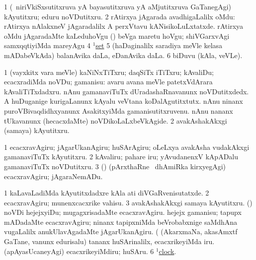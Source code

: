 \noindent 
\gl{\pagu}
\expl{}
\bmng
\bnum
\num{1}  (\sA\ niriVkiSxsutitxruva yA bayasutitxruva yA aMjutitxruva GaTanegAgi) kAyutitxru; eduru noVDutitxru. 
\num{2}  rAtirxya jAgarada avadhigaLalilx oMdu:  rAtirxya nAlakxneV jAgaradalilx A perxVtavu kANisikoLuLxtatxde. 
  
\banum
{} rAtirxya oMdu jAgaradaMte kaLeduhoVgu 
 (\rUpa) beVga maretu hoVgu; shiVGarxvAgi samxqqtiyiMda mareyAgu 
\eanum
\numie
\num{4} \hyperref{kandict_s.pdf}{S}{set(1) pagu(10)}{$^1$set}  
\num{5}  (haDaginalilx saradiya meVle kelasa mADabeVkAda) balanAvika daLa, eDanAvika daLa. 
\num{6}  biDuvu (kAla, veVLe). 
\enum
\emng
\eentry

\bentry
{} 
\gl{\sakirx}
\expl{}
\bmng
\bnum
\num{1} (vayxkitx \mo vara meVle) kaNiNxTiTxru; daqSiTx iTiTxru; kAvaliDu; ecacxradiMda noVDu; gamanisu:  avaru avana meVle patetxVdArara kAvaliTiTxdadxru.  nAnu gamanaviTuTx dUradashaRnavanunx noVDutitxdedx.  A huDuganige kurigaLanunx kAyalu veVtana koDalAgutitxtutx.  nAnu ninanx puroVBivaqdidhxyanunx AsakitxyiMda gamanisutitxruvenu.  nAnu nananx tUkavanunx (hecacxdaMte) noVDikoLaLxbeVkAgide. 
\num{2} avakAshakAkxgi (samaya) kAyutitxru. 
\enum
\emng

\noindent 
\gl{\akirx}
\expl{}
\bmng
\bnum
\num{1} ecacxravAgiru; jAgarUkanAgiru; huSArAgiru; oLeLxya avakAsha \mo vudakAkxgi gamanaviTuTx kAyutitxru. 
\num{2} kAvaliru; pahare iru; yAvudanenxV kApADalu gamanaviTuTx noVDutitxru. 
\num{3} (\pArxparx) (pArxthaRne \mo\ dhAmiRka kirxyegAgi) ecacxravAgiru; jAgaraNemADu. 
\enum
\emng

\noindent 
\gl{\pagu}
\expl{}
\bmng
\bnum
\num{1}  kaLavaLadiMda kAyutitxdadxre kAla ati diVGaRvenisutatxde. 
\num{2}  ecacxravAgiru; munenxcacxrike vahisu. 
\num{3}  avakAshakAkxgi samaya kAyutitxru. \eng{} 
  (\AmA) 
\banum
{} noVDi hejejxyiDu; mugagxrisadaMte ecacxravAgiru. 
 hejejx gamanisu; tapupx mADadaMte ecacxravAgiru; ninanx tapipxniMda beVrobabxnige saMdhAna \mo vugaLalilx anukUlavAgadaMte jAgarUkanAgiru. 
\eanum
\numie
{}  (  
\banum
{} (AkarxmaNa, akasAmxtf GaTane, \mo vanunx edurisalu) tananx huSArinalilx, ecacxrikeyiMda iru. 
 (apAyasUcaneyAgi) ecacxrikeyiMdiru; huSAru. 
\eanum
\numie
\num{6}  \hyperref{kandict_c.pdf}{C}{clock(1)nuga(6)}{$^1$clock}. 
\enum
\emng
\eentry

